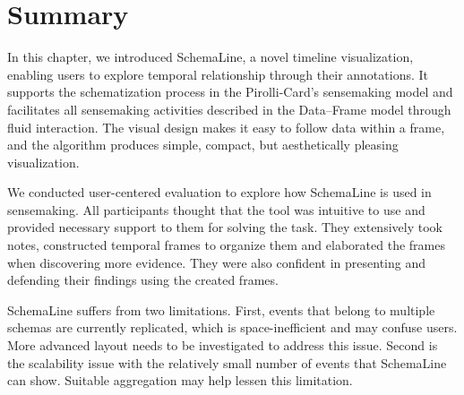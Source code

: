 \section{Summary}
In this chapter, we introduced SchemaLine, a novel timeline visualization, enabling users to explore temporal relationship through their annotations. It supports the schematization process in the Pirolli-Card's sensemaking model and facilitates all sensemaking activities described in the Data--Frame model through fluid interaction. The visual design makes it easy to follow data within a frame, and the algorithm produces simple, compact, but aesthetically pleasing visualization. 

We conducted user-centered evaluation to explore how SchemaLine is used in sensemaking. All participants thought that the tool was intuitive to use and provided necessary support to them for solving the task. They extensively took notes, constructed temporal frames to organize them and elaborated the frames when discovering more evidence. They were also confident in presenting and defending their findings using the created frames.

SchemaLine suffers from two limitations. First, events that belong to multiple schemas are currently replicated, which is space-inefficient and may confuse users. More advanced layout needs to be investigated to address this issue. Second is the scalability issue with the relatively small number of events that SchemaLine can show. Suitable aggregation may help lessen this limitation.